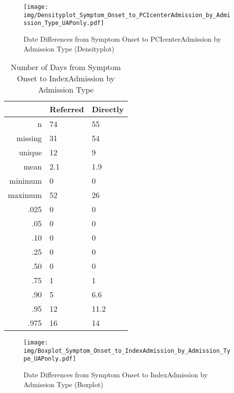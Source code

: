 \documentclass[presentation,xcolor=pdftex,dvipsnames,table,11pt]{beamer}
\begin{document}
\begin{tiny}
\begin{frame}
\begin{figure}
  \centering
  \caption{Date Differences from Symptom Onset to PCIcenterAdmission by Admission Type (Densityplot)}
  \label{Density: Date Differences from Symptom Onset to PCIcenterAdmission by Admission Type}
\texttt{[image: img/Densityplot\_Symptom\_Onset\_to\_PCIcenterAdmission\_by\_Admission\_Type\_UAPonly.pdf]}\end{figure}
\end{frame}




\begin{table}[ht]
\centering
\begin{tabular}{rll}
  \toprule
 & Referred & Directly \\ 
  \midrule
n & 74 & 55 \\ 
  missing & 31 & 54 \\ 
  unique & 12 & 9 \\ 
  mean & 2.1 & 1.9 \\ 
  minimum & 0 & 0 \\ 
  maximum & 52 & 26 \\ 
  .025 & 0 & 0 \\ 
  .05 & 0 & 0 \\ 
  .10 & 0 & 0 \\ 
  .25 & 0 & 0 \\ 
  .50 & 0 & 0 \\ 
  .75 & 1 & 1 \\ 
  .90 & 5 & 6.6 \\ 
  .95 & 12 & 11.2 \\ 
  .975 & 16 & 14 \\ 
   \bottomrule
\end{tabular}
\caption{Number of Days from Symptom Onset to IndexAdmission by Admission Type} 
\end{table}
\begin{frame}
\begin{figure}
  \centering
  \caption{Date Differences from Symptom Onset to IndexAdmission by Admission Type (Boxplot)}
  \label{Boxplot: Date Differences from Symptom Onset to IndexAdmission by Admission Type}
\texttt{[image: img/Boxplot\_Symptom\_Onset\_to\_IndexAdmission\_by\_Admission\_Type\_UAPonly.pdf]}\end{figure}
\end{frame}



\end{tiny}
\end{document}
